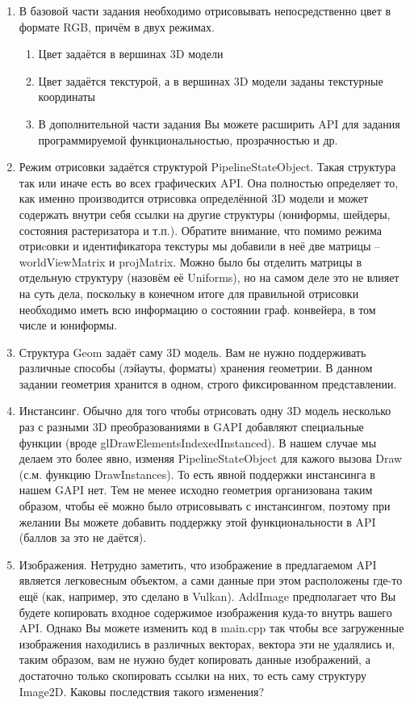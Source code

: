 \documentclass[12pt,subf,href,colorlinks=true]{article}
\begin{document}
\begin{enumerate}
\item В базовой части задания необходимо отрисовывать непосредственно цвет в формате RGB, причём в двух режимах.
\begin{enumerate}
\item Цвет задаётся в вершинах 3D модели
\item Цвет задаётся текстурой, а в вершинах 3D модели заданы текстурные координаты
\item В дополнительной части задания Вы можете расширить API для задания программируемой функциональностью, прозрачностью и др.
\end{enumerate}

\item Режим отрисовки задаётся структурой PipelineStateObject. Такая структура так или иначе есть во всех графических API. Она полностью определяет то, как именно производится отрисовка определённой 3D модели и может содержать внутри себя ссылки на другие структуры (юниформы, шейдеры, состояния растеризатора и т.п.). Обратите внимание, что помимо режима отриcовки и идентификатора текстуры мы добавили в неё две матрицы -- worldViewMatrix и projMatrix. Можно было бы отделить матрицы в отдельную структуру (назовём её Uniforms), но на самом деле это не влияет на суть дела, поскольку в конечном итоге для правильной отрисовки необходимо иметь всю информацию о состоянии граф. конвейера, в том числе и юниформы.

\item Структура Geom задаёт саму 3D модель. Вам не нужно поддерживать различные способы (лэйауты, форматы) хранения геометрии. В данном задании геометрия хранится в одном, строго фиксированном представлении.

\item Инстансинг. Обычно для того чтобы отрисовать одну 3D модель несколько раз с разными 3D преобразованиями в GAPI добавляют специальные функции (вроде glDrawElementsIndexedInstanced). В нашем случае мы делаем это более явно, изменяя PipelineStateObject для кажого вызова Draw (с.м. функцию DrawInstances). То есть явной поддержки инстансинга в нашем GAPI нет. Тем не менее исходно геометрия организована таким образом, чтобы её можно было отрисовывать с инстансингом, поэтому при желании Вы можете добавить поддержку этой функциональности в API (баллов за это не даётся). 

\item Изображения. Нетрудно заметить, что изображение в предлагаемом API является легковесным объектом, а сами данные при этом расположены где-то ещё (как, например, это сделано в Vulkan). AddImage предполагает что Вы будете копировать входное содержимое изображения куда-то внутрь вашего API. Однако Вы можете изменить код в main.cpp так чтобы все загруженные изображения находились в различных векторах, вектора эти не удалялись и, таким образом, вам не нужно будет копировать данные изображений, а достаточно только скопировать ссылки на них, то есть саму структуру Image2D. Каковы последствия такого изменения?  


\end{enumerate}
\end{document}
